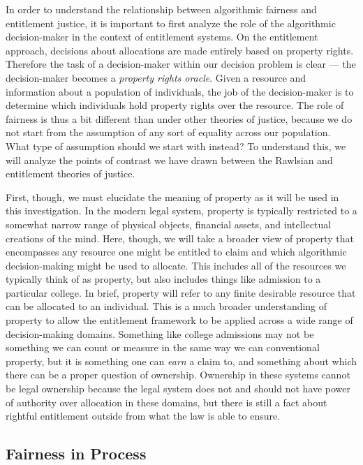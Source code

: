 In order to understand the relationship between algorithmic fairness and
entitlement justice, it is important to first analyze the role of the
algorithmic decision-maker in the context of entitlement systems. On the 
entitlement approach, decisions about allocations are made entirely based on
property rights. Therefore the task of a decision-maker within our decision
problem is clear — the decision-maker becomes a \emph{property rights oracle}.
Given a resource and information about a population of individuals, the job of
the decision-maker is to determine which individuals hold property rights over
the resource. The role of fairness is thus a bit different than under other
theories of justice, because we do not start from the assumption of any sort of
equality across our population. What type of assumption should we start with 
instead? To understand this, we will analyze the points of contrast we have
drawn between the Rawlsian and entitlement theories of justice.

First, though, we must elucidate the meaning of property as it will be used in
this investigation. In the modern legal system, property is typically restricted
to a somewhat narrow range of physical objects, financial assets, and 
intellectual creations of the mind. Here, though, we will take a broader view of
property that encompasses any resource one might be entitled to claim and which
algorithmic decision-making might be used to allocate. This includes all of the
resources we typically think of as property, but also includes things like
admission to a particular college. In brief, property will refer to any finite
desirable resource that can be allocated to an individual. This is a much
broader understanding of property to allow the entitlement framework to be 
applied across a wide range of decision-making domains. Something like college
admissions may not be something we can count or measure in the same way we can
conventional property, but it is something one can \emph{earn} a claim to, and
something about which there can be a proper question of ownership. Ownership in
these systems cannot be legal ownership because the legal system does not and
should not have power of authority over allocation in these domains, but there
is still a fact about rightful entitlement outside from what the law is able to
ensure.

\subsection{Fairness in Process}

